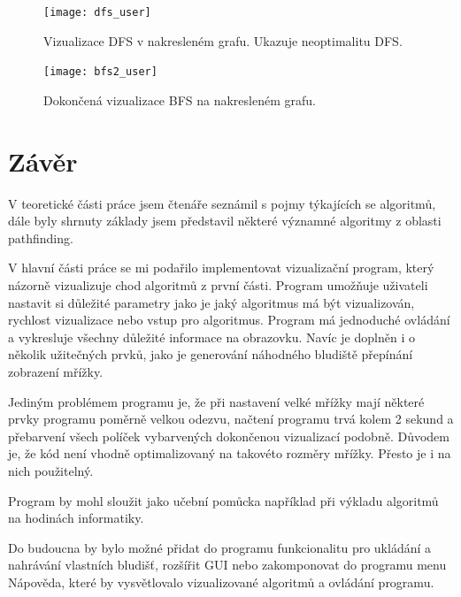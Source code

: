 \documentclass[12pt]{report}			%
\begin{document}
\begin{figure}[h]
\begin{minipage}[outer sep=0]{\textwidth}
\begin{minipage}[t]{0.48\textwidth}
			
			\texttt{[image: dfs\_user]}\caption{Vizualizace DFS v nakresleném grafu. Ukazuje neoptimalitu DFS.}\label{dfs_user}
			
    \end{minipage}\hfill
    \begin{minipage}[t]{0.48\textwidth}
\texttt{[image: bfs2\_user]}\caption{Dokončená vizualizace BFS na nakresleném grafu.}\label{bfs2_user}
    \end{minipage}
    \end{minipage}\vspace{1ex}
\end{figure}


	\chapter*{Závěr}
	
		V teoretické části práce jsem čtenáře seznámil s pojmy týkajících se algoritmů, dále byly shrnuty základy 
		jsem představil některé významné algoritmy z oblasti pathfinding. 
		
		V hlavní části práce se mi podařilo implementovat vizualizační program, který názorně vizualizuje chod algoritmů z první části. Program umožňuje uživateli nastavit si důležité parametry jako je jaký algoritmus má být vizualizován, rychlost vizualizace nebo vstup pro algoritmus. Program má jednoduché ovládání a vykresluje všechny důležité informace na obrazovku. Navíc je doplněn i o několik užitečných prvků, jako je generování náhodného bludiště přepínání zobrazení mřížky.
		
		Jediným problémem programu je, že při nastavení velké mřížky mají některé prvky programu poměrně velkou odezvu, načtení programu trvá kolem 2 sekund a přebarvení všech políček vybarvených dokončenou vizualizací podobně. Důvodem je, že kód není vhodně optimalizovaný na takovéto rozměry mřížky. Přesto je i na nich použitelný.
		
		Program by mohl sloužit jako učební pomůcka například při výkladu algoritmů na hodinách informatiky.
		
		Do budoucna by bylo možné přidat do programu funkcionalitu pro ukládání a nahrávání vlastních bludišť, rozšířit GUI nebo zakomponovat do programu menu Nápověda, které by vysvětlovalo vizualizované algoritmů a ovládání programu. 
	
\end{document}
